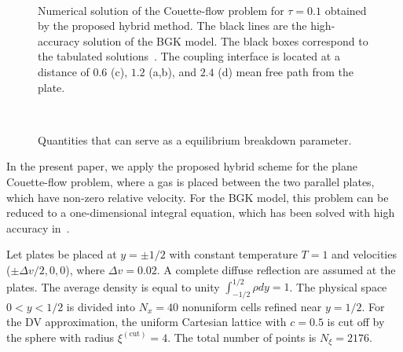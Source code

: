 \documentclass{aip-cp}
\makeatletter
\newenvironment{subfigures}
 {\begin{minipage}{\columnwidth}\def\@captype{figure}\centering}
 {\end{minipage}}
\makeatother
\begin{document}
\begin{figure}
    \begin{subfigures}
    \centering
    \\
    \end{subfigures}
    \caption{
        Numerical solution of the Couette-flow problem for $\tau=0.1$ obtained by the proposed hybrid method.
        The black lines are the high-accuracy solution of the BGK model.
        The black boxes correspond to the tabulated solutions~\cite{Luo2015, Luo2016}.
        The coupling interface is located at a distance of $0.6$ (c),
        $1.2$ (a,b), and $2.4$ (d) mean free path from the plate.
    }\label{fig:hybrid}
\end{figure}

\begin{figure}
    \begin{subfigures}
    \centering
    \\
    \end{subfigures}
    \caption{
        Quantities that can serve as a equilibrium breakdown parameter.
    }\label{fig:norms}
\end{figure}

In the present paper, we apply the proposed hybrid scheme for the plane Couette-flow problem,
where a gas is placed between the two parallel plates, which have non-zero relative velocity.
For the BGK model, this problem can be reduced to a one-dimensional integral equation,
which has been solved with high accuracy in~\cite{Luo2015, Luo2016}.

Let plates be placed at $y = \pm 1/2$ with constant temperature $T = 1$ and velocities ($\pm\Delta v/2,0,0$), where $\Delta v=0.02$.
A complete diffuse reflection are assumed at the plates.
The average density is equal to unity $\int_{-1/2}^{1/2}\rho dy=1$.
The physical space $0 < y < 1/2$ is divided into $N_x = 40$ nonuniform cells refined near $y = 1/2$.
For the DV approximation, the uniform Cartesian lattice with $c=0.5$ is cut off by the sphere with radius $\xi^{(\mathrm{cut})}=4$.
The total number of points is $N_\xi=2176$.
\end{document}
